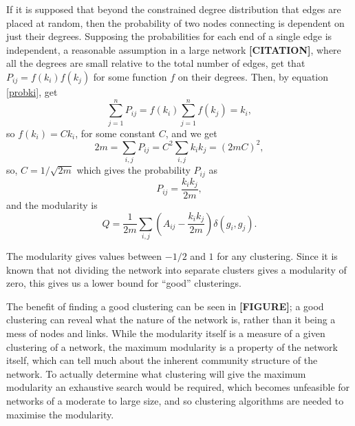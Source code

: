 If it is supposed that beyond the constrained degree distribution that edges are placed at random, 
then the probability of two nodes connecting is dependent on just their 
degrees. Supposing the probabilities for each end of a single edge is independent, a reasonable assumption in a large network {\bf[CITATION]}, where all the degrees are small 
relative to the total number of edges, get that $P_{ij} = f(k_i)f(k_j)$ for 
some function $f$ on their degrees.  Then, by equation \ref{probki}, get
\begin{equation}
\sum_{j=1}^{n}P_{ij} = f(k_i)\sum_{j=1}^nf(k_j)=k_i,
\end{equation}
so $f(k_i) = Ck_i$, for some constant $C$, and we get
\begin{equation}
2m = \sum_{i,j}P_{ij} = C^2\sum_{i,j}k_ik_j = (2mC)^2,
\end{equation}
so, $C = 1/\sqrt{2m}$ which gives the probability $P_{ij}$ as
\begin{equation}
P_{ij} = \frac{k_i k_j}{2m},
\end{equation}
and the modularity is
\begin{equation}\label{NewMod}
Q= \frac{1}{2m}\sum_{i,j} \left(A_{ij} -
\frac{k_ik_j}{2m}\right)\delta(g_i,g_j).
\end{equation}

The modularity gives values between $-1/2$ and $1$ for any clustering.  Since it is known that not 
dividing the network into separate clusters gives a modularity of zero, this 
gives us a lower bound for ``good'' clusterings.

The benefit of finding a good clustering can be seen in {\bf[FIGURE]}; 
a good clustering can reveal what the nature of the network is, rather than it 
being a mess of nodes and links.  While the modularity itself is a measure of a 
given clustering of a network, the maximum modularity is a property of the 
network itself, which can tell much about the inherent community structure of the 
network. To actually determine what clustering will give the maximum modularity an exhaustive search would be required, which becomes unfeasible for networks of 
a moderate to large size, and so clustering algorithms are needed to 
maximise the modularity.



